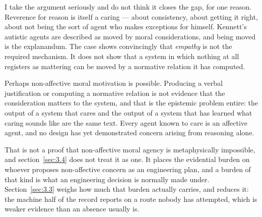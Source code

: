 I take the argument seriously and do not think it closes the gap, for one reason. Reverence for reason is itself a caring — about consistency, about getting it right, about not being the sort of agent who makes exceptions for himself. Kennett's autistic agents are described as moved by moral considerations, and being moved is the explanandum. The case shows convincingly that \emph{empathy} is not the required mechanism. It does not show that a system in which nothing at all registers as mattering can be moved by a normative relation it has computed.

Perhaps non-affective moral motivation is possible. Producing a verbal justification or computing a normative relation is not evidence that the consideration matters to the system, and that is the epistemic problem entire: the output of a system that cares and the output of a system that has learned what caring sounds like are the same text. Every agent known to care is an affective agent, and no design has yet demonstrated concern arising from reasoning alone.

That is not a proof that non-affective moral agency is metaphysically impossible, and section~\ref{sec:3.4} does not treat it as one. It places the evidential burden on whoever proposes non-affective concern as an engineering plan, and a burden of that kind is what an engineering decision is normally made under. Section~\ref{sec:3.3} weighs how much that burden actually carries, and reduces it: the machine half of the record reports on a route nobody has attempted, which is weaker evidence than an absence usually is.
